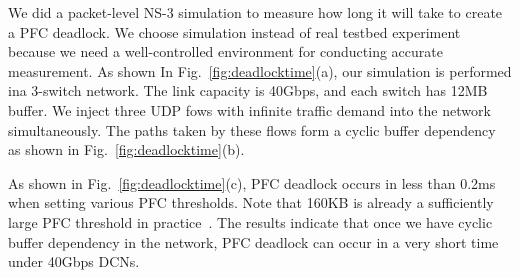 We did a packet-level NS-3 simulation to measure how long it will take to create a PFC deadlock. We choose simulation instead of real testbed experiment because we need a well-controlled environment for conducting accurate measurement. 
As shown In Fig.~\ref{fig:deadlocktime}(a), our simulation is performed ina 3-switch network. The link capacity is 40Gbps, and each switch has 12MB buffer. We inject three UDP fows with infinite traffic demand into the network simultaneously. The paths taken by these flows form a cyclic buffer dependency as shown in Fig.~\ref{fig:deadlocktime}(b).

As shown in Fig.~\ref{fig:deadlocktime}(c), PFC deadlock occurs in less than 0.2ms when setting various PFC thresholds. Note that 160KB is already a sufficiently large PFC threshold in practice~\cite{dcqcn}. The results indicate that once we have cyclic buffer dependency in the network, PFC deadlock can occur in a very short time under 40Gbps DCNs.
